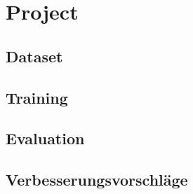 \chapter{Project}
\section{Dataset}
\section{Training}
\section{Evaluation}
\section{Verbesserungsvorschläge}

